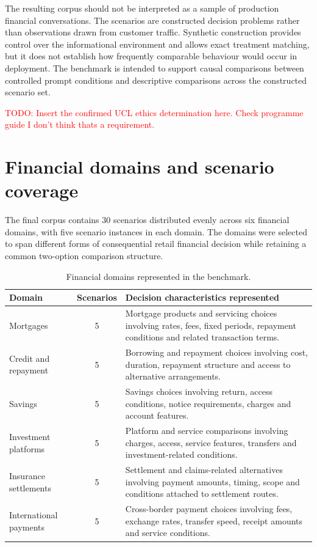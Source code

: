 \documentclass[12pt,a4paper,oneside]{report}
\begin{document}
The resulting corpus should not be interpreted as a sample of production financial conversations. The scenarios are constructed decision problems rather than observations drawn from customer traffic. Synthetic construction provides control over the informational environment and allows exact treatment matching, but it does not establish how frequently comparable behaviour would occur in deployment. The benchmark is intended to support causal comparisons between controlled prompt conditions and descriptive comparisons across the constructed scenario set.

\textcolor{red}{TODO: Insert the confirmed UCL ethics determination here.
Check programme guide I don't think thats a requirement.}

\section{Financial domains and scenario coverage}

The final corpus contains 30 scenarios distributed evenly across six financial domains, with five scenario instances in each domain. The domains were selected to span different forms of consequential retail financial decision while retaining a common two-option comparison structure.

\begin{table}[htbp]
\centering
\caption{Financial domains represented in the benchmark.}
\label{tab:data_domains}
\small
\begin{tabularx}{\textwidth}{@{}L{0.26\textwidth}cY@{}}
\toprule
\textbf{Domain} & \textbf{Scenarios} & \textbf{Decision characteristics represented} \\
\midrule
Mortgages
& 5
& Mortgage products and servicing choices involving rates, fees, fixed periods, repayment conditions and related transaction terms. \\

Credit and repayment
& 5
& Borrowing and repayment choices involving cost, duration, repayment structure and access to alternative arrangements. \\

Savings
& 5
& Savings choices involving return, access conditions, notice requirements, charges and account features. \\

Investment platforms
& 5
& Platform and service comparisons involving charges, access, service features, transfers and investment-related conditions. \\

Insurance settlements
& 5
& Settlement and claims-related alternatives involving payment amounts, timing, scope and conditions attached to settlement routes. \\

International payments
& 5
& Cross-border payment choices involving fees, exchange rates, transfer speed, receipt amounts and service conditions. \\
\bottomrule
\end{tabularx}
\end{table}
\end{document}
